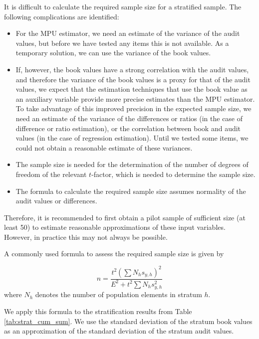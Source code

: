 It is difficult to calculate the required sample size for a stratified sample. The following complications are identified:
\begin{itemize}
\item For the MPU estimator, we need an estimate of the variance of the audit values, but before we have tested any items this is not available. As a temporary solution, we can use the variance of the book values.
\item If, however, the book values have a strong correlation with the audit values, and therefore the variance of the book values is a proxy for that of the audit values, we expect that the estimation techniques that use the book value as an auxiliary variable provide more precise estimates than the MPU estimator. To take advantage of this improved precision in the expected sample size, we need an estimate of the variance of the differences or ratios (in the case of difference or ratio estimation), or the correlation between book and audit values (in the case of regression estimation). Until we tested some items, we could not obtain a reasonable estimate of these variances.
\item The sample size is needed for the determination of the number of degrees of freedom of the relevant $t$-factor, which is needed to determine the sample size.
\item The formula to calculate the required sample size assumes normality of the audit values or differences.
\end{itemize} 

\bigskip
Therefore, it is recommended to first obtain a pilot sample of sufficient size (at least 50) to estimate reasonable approximations of these input variables. However, in practice this may not always be possible.

A commonly used formula to assess the required sample size is given by

\begin{equation}
n = \frac{t^2(\sum{N_h s_{y,h}})^2}{E^2 + t^2\sum{N_h s_{y,h}^2}}
\label{eq:sample_size_strat}
\end{equation}
where $N_h$ denotes the number of population elements in stratum $h$.

We apply this formula to the stratification results from Table \ref{tab:strat_cum_sum}. We use the standard deviation of the stratum book values as an approximation of the standard deviation of the stratum audit values.

